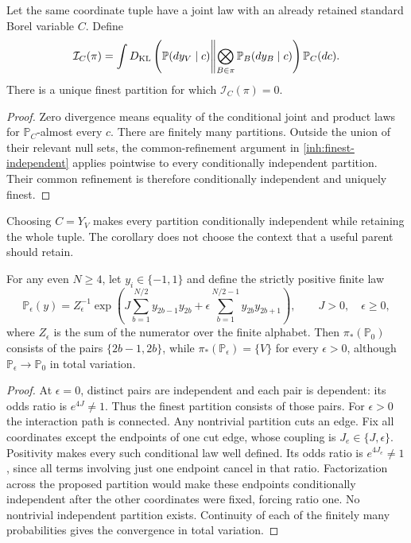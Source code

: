 Let the same coordinate tuple have a joint law with an already retained
standard Borel variable $C$. Define
\begin{equation}
 \mathcal I_C(\pi)=
 \int D_{\mathrm{KL}}\left(
 \mathbb P(dy_V\mid c)
 \middle\Vert
 \bigotimes_{B\in\pi}\mathbb P_B(dy_B\mid c)
 \right)\mathbb P_C(dc).
 \label{inh:conditional-partition-information}
\end{equation}
There is a unique finest partition for which $\mathcal I_C(\pi)=0$.
\begin{proof}
Zero divergence means equality of the conditional joint and product
laws for $\mathbb P_C$-almost every $c$. There are finitely many
partitions. Outside the union of their relevant null sets, the
common-refinement argument in \cref{inh:finest-independent} applies
pointwise to every conditionally independent partition. Their common
refinement is therefore conditionally independent and uniquely finest.
\end{proof}

Choosing $C=Y_V$ makes every partition conditionally independent while
retaining the whole tuple. The corollary does not choose the context
that a useful parent should retain.

For any even $N\geq4$, let $y_i\in\{-1,1\}$ and define the strictly
positive finite law
\begin{equation}
 \mathbb P_\epsilon(y)
 =Z_\epsilon^{-1}\exp\left(
 J\sum_{b=1}^{N/2}y_{2b-1}y_{2b}
 +\epsilon\sum_{b=1}^{N/2-1}y_{2b}y_{2b+1}
 \right),
 \qquad J>0,\quad\epsilon\geq0,
 \label{inh:ising-partition}
\end{equation}
where $Z_\epsilon$ is the sum of the numerator over the finite alphabet.
Then $\pi_*(\mathbb P_0)$ consists of the pairs $\{2b-1,2b\}$, while
$\pi_*(\mathbb P_\epsilon)=\{V\}$ for every $\epsilon>0$, although
$\mathbb P_\epsilon\to\mathbb P_0$ in total variation.

\begin{proof}
At $\epsilon=0$, distinct pairs are independent and each pair is
dependent: its odds ratio is $e^{4J}\ne1$. Thus the finest partition
consists of those pairs.
For $\epsilon>0$ the interaction path is connected. Any nontrivial
partition cuts an edge. Fix all coordinates except the endpoints of
one cut edge, whose coupling is $J_e\in\{J,\epsilon\}$. Positivity
makes every such conditional law well defined. Its odds ratio is
$e^{4J_e}\ne1$, since all terms involving just one endpoint cancel
in that ratio. Factorization across the proposed partition would make
these endpoints conditionally independent after the other coordinates
were fixed, forcing ratio one. No nontrivial independent partition
exists. Continuity of each of the finitely many probabilities gives the
convergence in total variation.
\end{proof}

